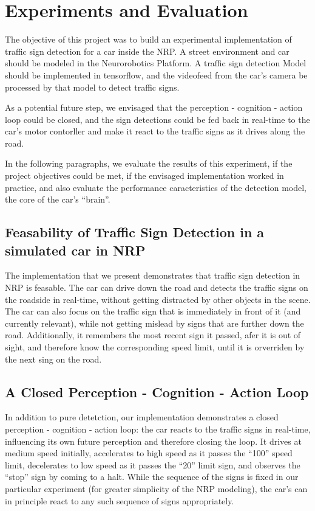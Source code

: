 
\section{Experiments and Evaluation}

The objective of this project was to build an experimental implementation of traffic sign detection for a car inside the NRP. 
A street environment and car should be modeled in the Neurorobotics Platform. A traffic sign detection Model should be implemented in tensorflow, and the videofeed from the car's camera be processed by that model to detect traffic signs.

As a potential future step, we envisaged that the perception - cognition - action loop could be closed, and the sign detections could be fed back in real-time to the car's motor contorller and make it react to the traffic signs as it drives along the road.

In the following paragraphs, we evaluate the results of this experiment, if the project objectives could be met, if the envisaged implementation worked in practice, and also evaluate the performance caracteristics of the detection model, the core of the car's ``brain''.

\subsection{Feasability of Traffic Sign Detection in a simulated car in NRP}
The implementation that we present demonstrates that traffic sign detection in NRP is feasable. 
The car can drive down the road and detects the traffic signs on the roadside in real-time, without getting distracted by other objects in the scene. 
The car can also focus on the traffic sign that is immediately in front of it (and currently relevant), while not getting mislead by signs that are further down the road. 
Additionally, it remembers the most recent sign it passed, afer it is out of sight, and therefore know the corresponding speed limit, until it is orverriden by the next sing on the road.

\subsection{A Closed Perception - Cognition - Action Loop}
In addition to pure detetction, our implementation demonstrates a closed perception - cognition - action loop: 
the car reacts to the traffic signs in real-time, influencing its own future perception and therefore closing the loop. 
It drives at medium speed initially, accelerates to high speed as it passes the ``100'' speed limit, decelerates to low speed as it passes the ``20'' limit sign, and observes the ``stop'' sign by coming to a halt. 
While the sequence of the signs is fixed in our particular experiment (for greater simplicity of the NRP modeling), the car's can in principle react to any such sequence of signs appropriately.

